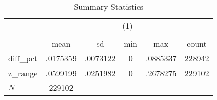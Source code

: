 \begin{table}[htbp]\centering
\def\sym#1{\ifmmode^{#1}\else\(^{#1}\)\fi}
\caption{Summary Statistics}
\begin{tabular}{l*{1}{ccccc}}
\hline\hline
            &\multicolumn{5}{c}{(1)}                                         \\
            &\multicolumn{5}{c}{}                                            \\
            &        mean&          sd&         min&         max&       count\\
\hline
diff\_pct    &    .0175359&    .0073122&           0&    .0885337&      228942\\
z\_range     &    .0599199&    .0251982&           0&    .2678275&      229102\\
\hline
\(N\)       &      229102&            &            &            &            \\
\hline\hline
\end{tabular}
\end{table}

